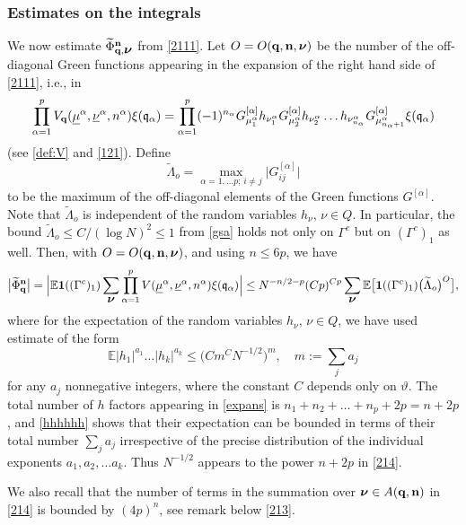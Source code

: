 \documentclass[draft]{article}
\newcommand{\ttau}{\vartheta}
\newcommand{\wt}{\widetilde}
\newcommand{\unu}{{\underline {\nu}}}
\newcommand{\umu}{{\underline {\mu}}}
\newcommand{\bq}{{\bf {q}}}
\newcommand{\bn}{{\bf{n}}}
\newcommand{\fq}{{\frak q}}
\newcommand{\sa}{{[\alpha ]}}
\newcommand{\bnu}{\mbox{\boldmath $\nu$}}
\newcommand{\al}{\alpha}
\newcommand{\be}{\begin{equation}}
\newcommand{\ee}{\end{equation}}
\newcommand{\E}{{\mathbb E }}
\numberwithin{equation}{section}
\numberwithin{theorem}{section}
\numberwithin{definition}{section}
\numberwithin{remark}{section}
\begin{document}
\subsubsection{Estimates on the integrals}  

\medskip

We now estimate $  \wt \Phi_{\bq,\bnu}^{\bf n}  $ from \eqref{2111}. 
Let $  O=O(\bq, \bn,\bnu)$ be the number of the off-diagonal Green functions
 appearing in the  expansion of the right hand side of \eqref{2111}, i.e., in 
\be
\prod_{\alpha=1}^{p}   V_\bq( \umu^\alpha, \unu^\alpha, n^\al)\xi(\fq_\al)
=  \prod_{\alpha=1}^{p} (-1)^{n_\al}G^{\sa }_{\mu^\alpha_1} h_{\nu^\alpha_1}
 G^{\sa }_{\mu^\alpha_2}h_{\nu^\alpha_2} \ldots 
 h_{\nu^\alpha_{n_\al}} G^{\sa }_{\mu^\alpha_{n_\alpha+1}} \xi(\fq_\al)
\label{expans}
\ee
(see  \eqref{def:V} and \eqref{121}). 
 Define  
\be
 \wt\Lambda_o   = \max_{\alpha = 1, \ldots p; \, i \not = j }  \big | G^{\sa }_{ij} \big |  
\ee  
to be the maximum of the off-diagonal elements of the Green functions $G^{\sa }$. 
 Note that $\wt\Lambda_o$ is independent of the random variables $h_\nu$, $\nu\in Q$.
In particular, the bound $\wt\Lambda_o\le C/(\log N)^2\le 1 $
from \eqref{gsa} holds not only on $\Gamma^c$ but on $(\Gamma^c)_1$ as well. 
Then, with $O=O(\bq, \bn,\bnu)$, and using $n\le 6p$, we have 
\be\label{214}
\big|\wt  \Phi_{\bq}^{\bf n}\big|  = 
\Big| \E {\bf 1} ((\Gamma^c)_1)   \sum_{ \bnu}  
\prod_{\alpha=1}^{p}   V( \umu^\alpha, \unu^\alpha, n^\al)
   \xi (\fq_\al) \Big| 
\le  N^{-n/2-p}(Cp)^{Cp} \sum_{ \bnu}  \E \big[
{\bf 1}((\Gamma^c)_1)  \big ( \wt \Lambda_o \big )^{O}\big],
\ee 
where  for the expectation of the random variables $h_\nu$, $\nu\in Q$,
we have used estimate of the form 
\be\label{hhhhhh}
\E |h_1|^{a_1} \ldots |h_k|^{a_k} \le \big  ( Cm^CN^{-1/2})^m, \quad m:=\sum_{j} a_j 
\ee
for any $a_j$  nonnegative integers, where 
the constant $C$ depends only on $\ttau$.
The total number of $h$ factors appearing in \eqref{expans} is
$n_1+n_2+\ldots +n_p +2p = n+2p$, and \eqref{hhhhhh} shows that
their expectation can be bounded in terms of their total number 
$\sum_j a_j$ irrespective of the precise distribution of the individual
exponents $a_1, a_2, \ldots  a_k$. Thus $N^{-1/2}$ appears to the power
$n+2p$ in \eqref{214}.

 We also recall that the number 
of terms in the summation over $\bnu\in A(\bq,\bn)$
in \eqref{214}
 is bounded by $(4p)^n$, see 
remark below \eqref{213}.
\end{document}
